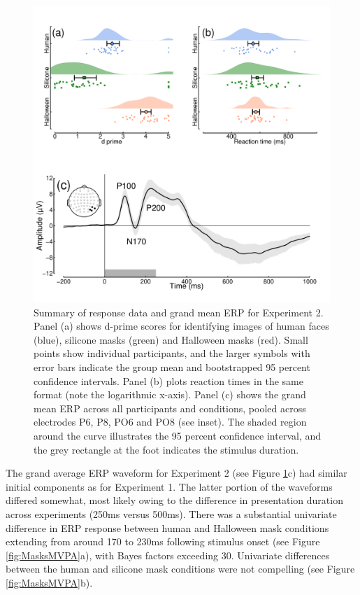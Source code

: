 \documentclass[
]{article}
\begin{document}
\begin{figure}

{\centering \includegraphics{Figures/MasksData} 

}

\caption{Summary of response data and grand mean ERP for Experiment 2. Panel (a) shows d-prime scores for identifying images of human faces (blue), silicone masks (green) and Halloween masks (red). Small points show individual participants, and the larger symbols with error bars indicate the group mean and bootstrapped 95 percent confidence intervals. Panel (b) plots reaction times in the same format (note the logarithmic x-axis). Panel (c) shows the grand mean ERP across all participants and conditions, pooled across electrodes P6, P8, PO6 and PO8 (see inset). The shaded region around the curve illustrates the 95 percent confidence interval, and the grey rectangle at the foot indicates the stimulus duration.}\label{fig:MasksData}
\end{figure}

The grand average ERP waveform for Experiment 2 (see Figure \ref{fig:MasksData}c) had similar initial components as for Experiment 1. The latter portion of the waveforms differed somewhat, most likely owing to the difference in presentation duration across experiments (250ms versus 500ms). There was a substantial univariate difference in ERP response between human and Halloween mask conditions extending from around 170 to 230ms following stimulus onset (see Figure \ref{fig:MasksMVPA}a), with Bayes factors exceeding 30. Univariate differences between the human and silicone mask conditions were not compelling (see Figure \ref{fig:MasksMVPA}b).
\end{document}
